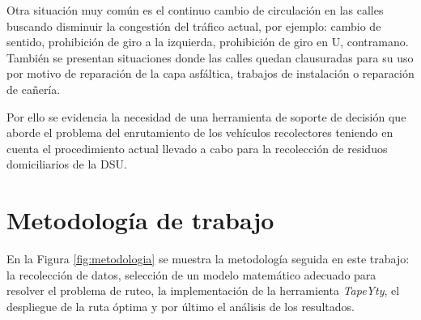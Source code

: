 Otra situación muy común es el continuo cambio de circulación en las calles buscando disminuir la congestión del tráfico actual, por ejemplo: cambio de sentido, prohibición de giro a la izquierda, prohibición de giro en U, contramano. También se presentan situaciones donde las calles quedan clausuradas para su uso por motivo de reparación de la capa asfáltica, trabajos de instalación o reparación de cañería.

Por ello se evidencia la necesidad de una herramienta de soporte de decisión que aborde el problema del enrutamiento de los vehículos recolectores teniendo en cuenta el procedimiento actual llevado a cabo para la recolección de residuos domiciliarios de la DSU.



\section{Metodología de trabajo}

En la Figura \ref{fig:metodologia} se muestra la metodología seguida en este trabajo: la recolección de datos, selección de un modelo matemático adecuado para resolver el problema de ruteo, la implementación de la herramienta \textit{TapeYty}, el despliegue de la ruta óptima y por último el análisis de los resultados.

